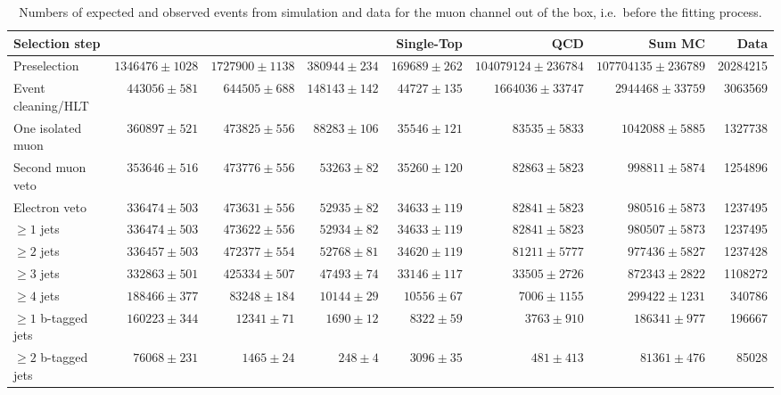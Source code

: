 \begin{table}
  \centering
   \caption{Numbers of expected and observed events from simulation and data
   for the muon channel out of the box, i.e.\ before the fitting process.}
    \label{tab:event_yields_mujets}
    \resizebox{\columnwidth}{!} {
    \begin{tabular}{lrrrrrrr}
    \toprule
	\textbf{Selection step} & \textbf{\ttjets} & \textbf{\WpJets} & \textbf{\ZpJets} & \textbf{Single-Top} & \textbf{QCD} & \textbf{Sum MC} & \textbf{Data} \\
	\midrule
	Preselection  &  $1346476 \pm 1028$ &  $1727900 \pm 1138$ &  $380944 \pm 234$ &  $169689 \pm 262$ &  $104079124 \pm 236784$ &  $107704135 \pm 236789$ &  20284215 \\ 
	Event cleaning/HLT  &  $443056 \pm 581$ &  $644505 \pm 688$ &  $148143 \pm 142$ &  $44727 \pm 135$ &  $1664036 \pm 33747$ &  $2944468 \pm 33759$ &  3063569 \\ 
	One isolated muon  &  $360897 \pm 521$ &  $473825 \pm 556$ &  $88283 \pm 106$ &  $35546 \pm 121$ &  $83535 \pm 5833$ &  $1042088 \pm 5885$ &  1327738 \\ 
	Second muon veto  &  $353646 \pm 516$ &  $473776 \pm 556$ &  $53263 \pm 82$ &  $35260 \pm 120$ &  $82863 \pm 5823$ &  $998811 \pm 5874$ &  1254896 \\ 
	Electron veto  &  $336474 \pm 503$ &  $473631 \pm 556$ &  $52935 \pm 82$ &  $34633 \pm 119$ &  $82841 \pm 5823$ &  $980516 \pm 5873$ &  1237495 \\ 
	$\geq 1$ jets  &  $336474 \pm 503$ &  $473622 \pm 556$ &  $52934 \pm 82$ &  $34633 \pm 119$ &  $82841 \pm 5823$ &  $980507 \pm 5873$ &  1237495 \\ 
	$\geq 2$ jets  &  $336457 \pm 503$ &  $472377 \pm 554$ &  $52768 \pm 81$ &  $34620 \pm 119$ &  $81211 \pm 5777$ &  $977436 \pm 5827$ &  1237428 \\ 
	$\geq 3$ jets  &  $332863 \pm 501$ &  $425334 \pm 507$ &  $47493 \pm 74$ &  $33146 \pm 117$ &  $33505 \pm 2726$ &  $872343 \pm 2822$ &  1108272 \\ 
	$\geq 4$ jets  &  $188466 \pm 377$ &  $83248 \pm 184$ &  $10144 \pm 29$ &  $10556 \pm 67$ &  $7006 \pm 1155$ &  $299422 \pm 1231$ &  340786 \\ 
	$\geq 1$ b-tagged jets  &  $160223 \pm 344$ &  $12341 \pm 71$ &  $1690 \pm 12$ &  $8322 \pm 59$ &  $3763 \pm 910$ &  $186341 \pm 977$ &  196667 \\ 
	$\geq 2$ b-tagged jets  &  $76068 \pm 231$ &  $1465 \pm 24$ &  $248 \pm 4$ &  $3096 \pm 35$ &  $481 \pm 413$ &  $81361 \pm 476$ &  85028 \\ 
	\bottomrule
	\end{tabular}
	}
\end{table}

